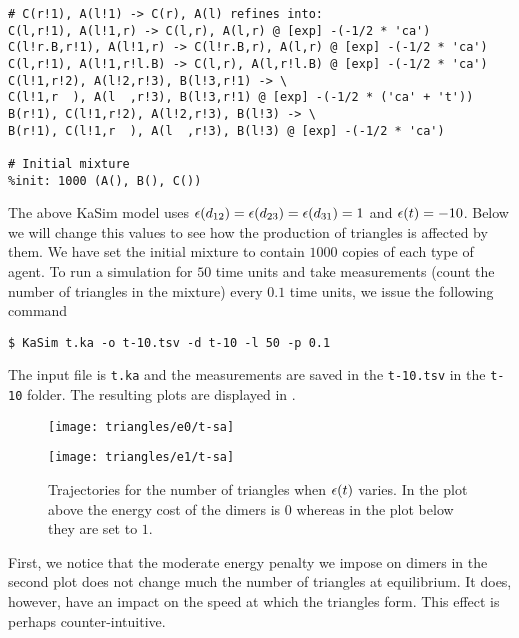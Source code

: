 \begin{lstlisting}[language=kappa]
# C(r!1), A(l!1) -> C(r), A(l) refines into:
C(l,r!1), A(l!1,r) -> C(l,r), A(l,r) @ [exp] -(-1/2 * 'ca')
C(l!r.B,r!1), A(l!1,r) -> C(l!r.B,r), A(l,r) @ [exp] -(-1/2 * 'ca')
C(l,r!1), A(l!1,r!l.B) -> C(l,r), A(l,r!l.B) @ [exp] -(-1/2 * 'ca')
C(l!1,r!2), A(l!2,r!3), B(l!3,r!1) -> \
C(l!1,r  ), A(l  ,r!3), B(l!3,r!1) @ [exp] -(-1/2 * ('ca' + 't'))
B(r!1), C(l!1,r!2), A(l!2,r!3), B(l!3) -> \
B(r!1), C(l!1,r  ), A(l  ,r!3), B(l!3) @ [exp] -(-1/2 * 'ca')

# Initial mixture
%init: 1000 (A(), B(), C())
\end{lstlisting}

The above KaSim model uses
$\epsilon(d_{12}) = \epsilon(d_{23}) = \epsilon(d_{31}) = 1$
and $\epsilon(t) = -10$.
Below we will change this values to see how
the production of triangles is affected by them.
We have set the initial mixture to contain
$1000$ copies of each type of agent.
To run a simulation for $50$ time units
and take measurements
(\ie count the number of triangles in the mixture)
every $0.1$ time units,
we issue the following command
\begin{lstlisting}[numbers=none]
$ KaSim t.ka -o t-10.tsv -d t-10 -l 50 -p 0.1
\end{lstlisting} %
The input file is \lstinline|t.ka| and
the measurements are saved in the \lstinline|t-10.tsv|
in the \lstinline|t-10| folder.
The resulting plots are displayed in \fig{triangles}.

\begin{figure}
  \begin{center}
    \texttt{[image: triangles/e0/t-sa]}
  \end{center}
  \begin{center}
    \texttt{[image: triangles/e1/t-sa]}
  \end{center}
  \caption{
    Trajectories for the number of triangles when $\epsilon(t)$ varies.
    In the plot above the energy cost of the dimers is $0$
    whereas in the plot below they are set to $1$.}
  \label{fig:triangles}
\end{figure}

\pagebreak

First, we notice that the moderate energy penalty
we impose on dimers in the second plot does not change much
the number of triangles at equilibrium.
It does, however, have an impact
on the speed at which the triangles form.
This effect is perhaps counter-intuitive.

